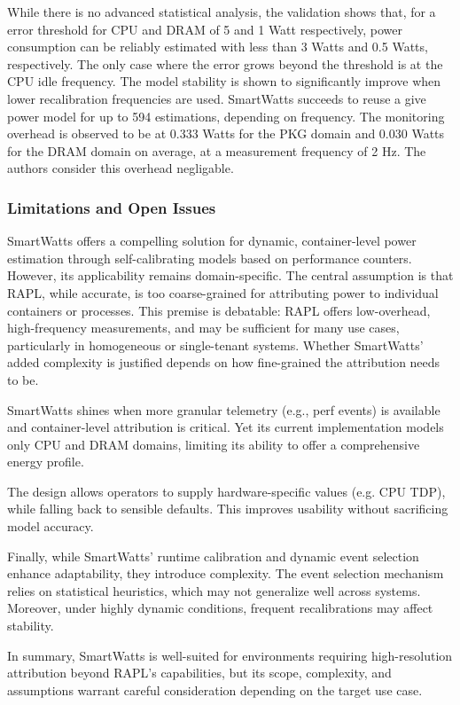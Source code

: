 While there is no advanced statistical analysis, the validation shows that, for a error threshold for CPU and DRAM of 5 and 1 Watt respectively, power consumption can be reliably estimated with less than 3 Watts and 0.5 Watts, respectively. The only case where the error grows beyond the threshold is at the CPU idle frequency. The model stability is shown to significantly improve when lower recalibration frequencies are used. SmartWatts succeeds to reuse a give power model for up to 594 estimations, depending on frequency. The monitoring overhead is observed to be at 0.333 Watts for the PKG domain and 0.030 Watts for the DRAM domain on average, at a measurement frequency of 2 Hz. The authors consider this overhead negligable.
\subsubsection{Limitations and Open Issues}
\label{sec:smartwatts-limitations}
SmartWatts offers a compelling solution for dynamic, container-level power estimation through self-calibrating models based on performance counters. However, its applicability remains domain-specific. The central assumption is that RAPL, while accurate, is too coarse-grained for attributing power to individual containers or processes. This premise is debatable: RAPL offers low-overhead, high-frequency measurements, and may be sufficient for many use cases, particularly in homogeneous or single-tenant systems. Whether SmartWatts' added complexity is justified depends on how fine-grained the attribution needs to be.

SmartWatts shines when more granular telemetry (e.g., perf events) is available and container-level attribution is critical. Yet its current implementation models only CPU and DRAM domains, limiting its ability to offer a comprehensive energy profile.

The design allows operators to supply hardware-specific values (e.g. CPU TDP), while falling back to sensible defaults. This improves usability without sacrificing model accuracy.

Finally, while SmartWatts' runtime calibration and dynamic event selection enhance adaptability, they introduce complexity. The event selection mechanism relies on statistical heuristics, which may not generalize well across systems. Moreover, under highly dynamic conditions, frequent recalibrations may affect stability.

In summary, SmartWatts is well-suited for environments requiring high-resolution attribution beyond RAPL's capabilities, but its scope, complexity, and assumptions warrant careful consideration depending on the target use case.


